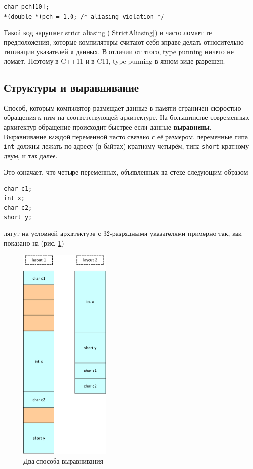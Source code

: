\documentclass[a4paper,12pt,oneside]{book}
\begin{document}
\begin{lstlisting}
char pch[10];
*(double *)pch = 1.0; /* aliasing violation */
\end{lstlisting}

Такой код нарушает strict aliasing (\ref{StrictAliasing}) и часто ломает те предположения, которые компиляторы считают себя вправе делать относительно типизации указателей и данных. В отличии от этого, type punning ничего не ломает. Поэтому в C++11 и в C11, type punning в явном виде разрешен.

\subsection{Структуры и выравнивание}

Способ, которым компилятор размещает данные в памяти ограничен скоростью обращения к ним на соответствующей архитектуре. На большинстве современных архитектур обращение происходит быстрее если данные \textbf{выравнены}. Выравнивание каждой переменной часто связано с её размером: переменные типа \lstinline!int! должны лежать по адресу (в байтах) кратному четырём, типа \lstinline!short! кратному двум, и так далее.

Это означает, что четыре переменных, объявленных на стеке следующим образом

\begin{lstlisting}
char c1;
int x;
char c2;
short y;
\end{lstlisting}

лягут на условной архитектуре с 32-разрядными указателями примерно так, как показано на (рис. \ref{fig:alignment})

\begin{figure}[h!]
\centering
\includegraphics[width=0.4\textwidth]{illustrations/alignment-crop.pdf}
\caption{Два способа выравнивания}
\label{fig:alignment}
\end{figure}
\end{document}
